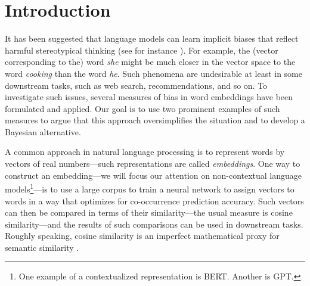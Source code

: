 \documentclass{clv3}
\begin{document}
\hypertarget{introduction}{%
\section{Introduction}\label{introduction}}

It has been suggested  that language models can learn implicit biases that reflect harmful
stereotypical thinking (see for instance \citealt{Bolukbasi2016man, Caliskan2017semanticsBiases, Gonen2019lipstick, Lauscher2019multidimensional, Garg2018years, Manzini2019blackToCriminal}).
For example, the (vector corresponding to the)
word \textit{she} might be much closer in the vector space to the word
\textit{cooking} than the word \textit{he}. Such phenomena are
undesirable at least in some downstream tasks, such as web search,
recommendations, and so on. To investigate such issues, several measures
of bias in word embeddings have been formulated and applied. Our goal is
to use two prominent examples of such measures to argue that this
approach oversimplifies the situation and to develop a Bayesian
alternative.

A common approach in natural language processing is to represent words
by vectors of real numbers---such representations are called
\emph{embeddings}. One way to construct an embedding---we will focus our
attention on non-contextual language models\footnote{One example of a
  contextualized representation is BERT. Another is GPT.}---is to use a
large corpus to train a neural network to assign vectors to words in a
way that optimizes for co-occurrence prediction accuracy. Such vectors
can then be compared in terms of their similarity---the usual measure is
cosine similarity---and the results of such comparisons can be used in
downstream tasks. Roughly speaking, cosine similarity is an imperfect
mathematical proxy for semantic similarity \citep{Mikolov2013efficient}.
\end{document}

